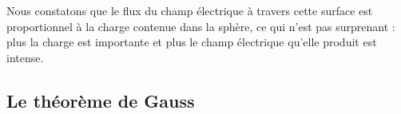\documentclass[11pt,fleqn]{book} %
\newcommand{\dd}{\mathrm{d}}
\begin{document}
%
%
%    

Nous constatons que le flux du champ électrique à travers cette surface est proportionnel à la charge contenue dans la sphère, ce qui n'est pas surprenant : plus la charge est importante et plus le champ électrique qu'elle produit est intense.

\subsection{Le théorème de Gauss}
\end{document}
